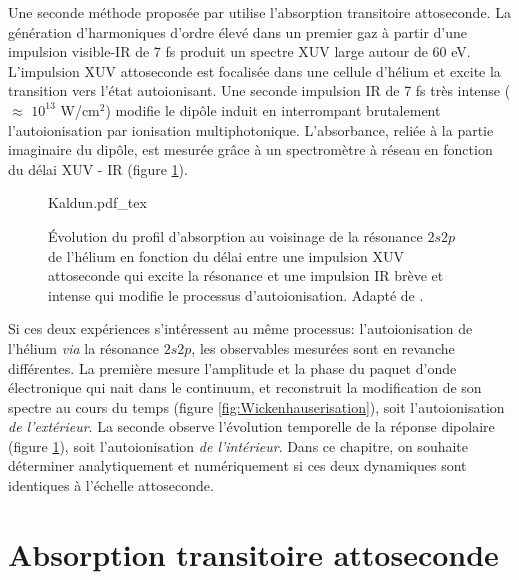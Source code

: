 Une seconde méthode proposée par  utilise l'absorption transitoire attoseconde. La génération d'harmoniques d'ordre élevé dans un premier gaz à partir d'une impulsion visible-IR de 7 fs produit un spectre XUV large autour de 60 eV. L'impulsion XUV attoseconde est focalisée dans une cellule d'hélium et excite la transition vers l'état autoionisant. Une seconde impulsion IR de 7 fs très intense ($\approx$ $10^{13}$ W/cm$^2$) modifie le dipôle induit en interrompant brutalement l'autoionisation par ionisation multiphotonique. L'absorbance, reliée à la partie imaginaire du dipôle, est mesurée grâce à un spectromètre à réseau en fonction du délai XUV - IR (figure \ref{fig:Kaldun}).

\begin{figure} [ht!]
\centering
\def\svgwidth{0.5\textwidth}
{Kaldun.pdf_tex}
\caption{\'{E}volution du profil d'absorption au voisinage de la résonance $2s2p$ de l'hélium en fonction du délai entre une impulsion XUV attoseconde qui excite la résonance et une impulsion IR brève et intense qui modifie le processus d'autoionisation. Adapté de .}
\label{fig:Kaldun}
\end{figure}

Si ces deux expériences s'intéressent au même processus: l'autoionisation de l'hélium \textit{via} la résonance $2s2p$, les observables mesurées sont en revanche différentes. La première mesure l'amplitude et la phase du paquet d'onde électronique qui nait dans le continuum, et reconstruit la modification de son spectre au cours du temps (figure \ref{fig:Wickenhauserisation}), soit l'autoionisation \textit{de l'extérieur}. La seconde observe l'évolution temporelle de la réponse dipolaire (figure \ref{fig:Kaldun}), soit l'autoionisation \textit{de l'intérieur}. Dans ce chapitre, on souhaite déterminer analytiquement et numériquement si ces deux dynamiques sont identiques à l'échelle attoseconde.

\section{Absorption transitoire attoseconde}
